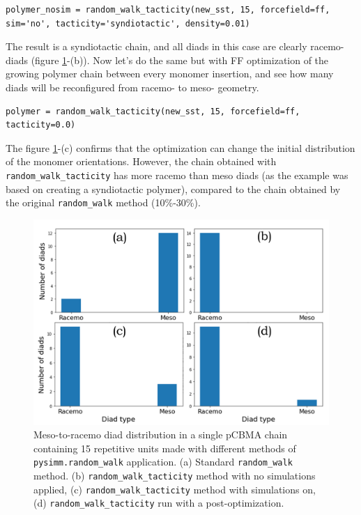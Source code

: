 \documentclass[9pt,tutorial]{livecoms}
\begin{document}
\begin{lstlisting}
polymer_nosim = random_walk_tacticity(new_sst, 15, forcefield=ff, sim='no', tacticity='syndiotactic', density=0.01)
\end{lstlisting}

The result is a syndiotactic chain, and all diads in this case are clearly racemo- diads (figure \ref{diads:distr}-(b)). Now let's do the same but with FF optimization of the growing polymer chain between every monomer insertion, and see how many diads will be reconfigured from racemo- to meso- geometry.

\begin{lstlisting}
polymer = random_walk_tacticity(new_sst, 15, forcefield=ff, tacticity=0.0)
\end{lstlisting}

The figure \ref{diads:distr}-(c) confirms that the optimization can change the initial distribution of the monomer orientations. However, the chain obtained with \lstinline$random_walk_tacticity$ has more racemo than meso diads (as the example was based on creating a syndiotactic polymer), compared to the chain obtained by the original \lstinline$random_walk$ method (10\%-30\%).

\begin{figure}[htbp]
  \centering
    \includegraphics[width=0.95\columnwidth]{figures/figure4}
    \caption{Meso-to-racemo diad distribution in a single pCBMA chain containing 15 repetitive units made with different methods of \lstinline$pysimm.random_walk$ application. (a) Standard \lstinline$random_walk$ method. (b) \lstinline$random_walk_tacticity$ method with no simulations applied, (c) \lstinline$random_walk_tacticity$ method with simulations on, (d) \lstinline$random_walk_tacticity$ run with a post-optimization.}
    \label{diads:distr}
\end{figure}
\end{document}
